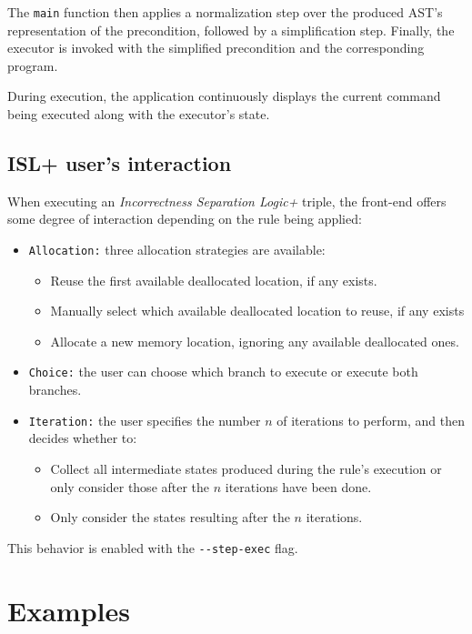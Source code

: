 \documentclass[parskip=half]{scrartcl}
\begin{document}
The \texttt{main} function then applies a normalization step over the produced AST's representation of the precondition, followed by a simplification step.
Finally, the executor is invoked with the simplified precondition and the corresponding program.

During execution, the application continuously displays the current command being executed along with the executor’s state.

\subsection{ISL+ user's interaction}
When executing an \textit{Incorrectness Separation Logic+} triple, the front-end offers some degree of interaction depending on the rule being applied:

\begin{itemize}
  \item \texttt{Allocation:} three allocation strategies are available:
    \begin{itemize}
      \item Reuse the first available deallocated location, if any exists.
      \item Manually select which available deallocated location to reuse, if any exists
      \item Allocate a new memory location, ignoring any available deallocated ones.
    \end{itemize}
  \item \texttt{Choice:} the user can choose which branch to execute or execute both branches.
  \item \texttt{Iteration:} the user specifies the number $n$ of iterations to perform, and then decides whether to: 
    \begin{itemize}
      \item Collect all intermediate states produced during the rule's execution or only consider those after the $n$ iterations have been done.
      \item Only consider the states resulting after the $n$ iterations.
    \end{itemize}
\end{itemize}

This behavior is enabled with the \verb|--step-exec| flag.

\section{Examples}
\end{document}
